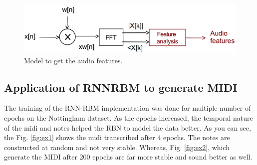 \documentclass[letterpaper, 10 pt, conference]{ieeeconf}
\begin{document}
\begin{figure}[thpb]
      \centering
      \includegraphics[scale=0.23]{spectral.png}
      \caption{Model to get the audio features.}
      \label{fig:spectral}
\end{figure}

\subsection{Application of RNNRBM to generate MIDI}
The training of the RNN-RBM implementation was done for multiple number of epochs on the Nottingham dataset. As the epochs increased, the temporal nature of the midi and notes helped the RBN to model the data better. As you can see, the Fig. \ref{fig:ex1} shows the midi transcribed after 4 epochs. The notes are constructed at random and not very stable. Whereas, Fig. \ref{fig:ex2}, which generate the MIDI after 200 epochs are far more stable and sound better as well. 
\end{document}
